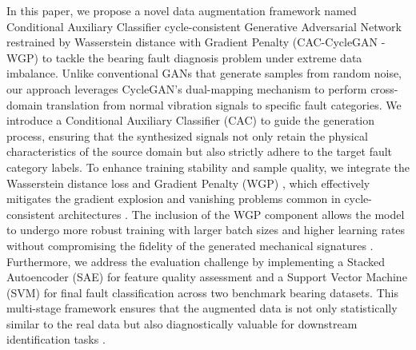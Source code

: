 In this paper, we propose a novel data augmentation framework named Conditional Auxiliary Classifier cycle-consistent \cite{chen2023cyclegan_fault_review} Generative Adversarial Network restrained by Wasserstein distance with Gradient Penalty (CAC-CycleGAN \cite{wang2024cyclegan_signal_aug}-WGP) to tackle the bearing fault diagnosis problem under extreme data imbalance. Unlike conventional GANs that generate samples from random noise, our approach leverages CycleGAN's dual-mapping mechanism \cite{zhu2017cyclegan, fernandez2022cyclegan_bearing} to perform cross-domain translation from normal vibration signals to specific fault categories. We introduce a Conditional Auxiliary Classifier (CAC) \cite{odena2017acgan, meng2022iacgan} to guide the generation process, ensuring that the synthesized signals not only retain the physical characteristics of the source domain but also strictly adhere to the target fault category labels. To enhance training stability and sample quality, we integrate the Wasserstein distance loss and Gradient Penalty (WGP) \cite{gulrajani2017wgangp, han2020wgangp_bearing}, which effectively mitigates the gradient explosion and vanishing problems common in cycle-consistent architectures \cite{zhang2022cwgan_gp, li2022cwgan_gp_pca}. The inclusion of the WGP component allows the model to undergo more robust training with larger batch sizes and higher learning rates without compromising the fidelity of the generated mechanical signatures \cite{gulrajani2017wgangp, li2021wgan_gp_fault}. Furthermore, we address the evaluation challenge by implementing a Stacked Autoencoder (SAE) \cite{hinton2006sae, shao2018sae_bearing, jia2016sae_bearing} for feature quality assessment and a Support Vector Machine (SVM) \cite{cortes1995svm, support2019svm_bearing, samanta2006svm_bearing} for final fault classification across two benchmark bearing datasets. This multi-stage framework ensures that the augmented data is not only statistically similar to the real data but also diagnostically valuable for downstream identification tasks \cite{shao2018sae_bearing, support2019svm_bearing}.

